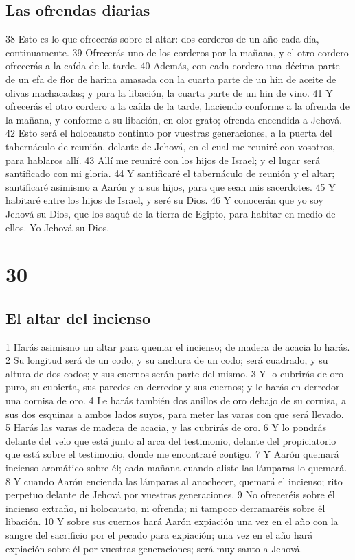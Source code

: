 \section{Las ofrendas diarias}

38 Esto es lo que ofrecerás sobre el altar: dos corderos de un año cada día, continuamente.
39 Ofrecerás uno de los corderos por la mañana, y el otro cordero ofrecerás a la caída de la tarde.
40 Además, con cada cordero una décima parte de un efa   de flor de harina amasada con la cuarta parte de un hin de aceite de olivas machacadas; y para la libación, la cuarta parte de un hin de vino.
41 Y ofrecerás el otro cordero a la caída de la tarde, haciendo conforme a la ofrenda de la mañana, y conforme a su libación, en olor grato; ofrenda encendida a Jehová.
42 Esto será el holocausto continuo por vuestras generaciones, a la puerta del tabernáculo de reunión, delante de Jehová, en el cual me reuniré con vosotros, para hablaros allí.
43 Allí me reuniré con los hijos de Israel; y el lugar será santificado con mi gloria.
44 Y santificaré el tabernáculo de reunión y el altar; santificaré asimismo a Aarón y a sus hijos, para que sean mis sacerdotes.
45 Y habitaré entre los hijos de Israel, y seré su Dios.
46 Y conocerán que yo soy Jehová su Dios, que los saqué de la tierra de Egipto, para habitar en medio de ellos. Yo Jehová su Dios.

\chapter{30}

\section{El altar del incienso}

1 Harás asimismo un altar para quemar el incienso; de madera de acacia lo harás.
2 Su longitud será de un codo,  y su anchura de un codo; será cuadrado, y su altura de dos codos; y sus cuernos serán parte del mismo.
3 Y lo cubrirás de oro puro, su cubierta, sus paredes en derredor y sus cuernos; y le harás en derredor una cornisa de oro.
4 Le harás también dos anillos de oro debajo de su cornisa, a sus dos esquinas a ambos lados suyos, para meter las varas con que será llevado.
5 Harás las varas de madera de acacia, y las cubrirás de oro.
6 Y lo pondrás delante del velo que está junto al arca del testimonio, delante del propiciatorio que está sobre el testimonio, donde me encontraré contigo.
7 Y Aarón quemará incienso aromático sobre él; cada mañana cuando aliste las lámparas lo quemará.
8 Y cuando Aarón encienda las lámparas al anochecer, quemará el incienso; rito perpetuo delante de Jehová por vuestras generaciones.
9 No ofreceréis sobre él incienso extraño, ni holocausto, ni ofrenda; ni tampoco derramaréis sobre él libación.
10 Y sobre sus cuernos hará Aarón expiación una vez en el año con la sangre del sacrificio por el pecado para expiación; una vez en el año hará expiación sobre él por vuestras generaciones; será muy santo a Jehová.

